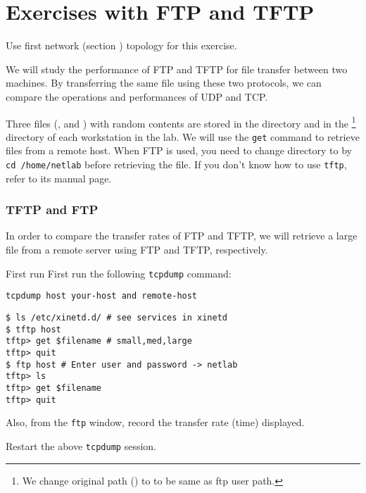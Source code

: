 \documentclass{../UTNetLab}
\begin{document}
\part{Exercises with FTP and TFTP}
    Use first network (section ) topology for this exercise.

    We will study the performance of FTP and TFTP for file transfer between two machines.
    By transferring the same file using these two protocols, we can compare the operations and performances of UDP and TCP. 

    Three files (,  and ) with random contents are stored in the  directory and in the \footnote{We change original path () to  to be same as ftp user path.} directory of each workstation in the lab.
    We will use the \lstinline{get} command to retrieve files from a remote host.
    When FTP is used, you need to change directory to  by \lstinline{cd /home/netlab} before retrieving the file.
    If you don’t know how to use \lstinline{tftp}, refer to its manual page.


\section{TFTP and FTP}
    In order to compare the transfer rates of FTP and TFTP, we will retrieve a large file from a remote server using FTP and TFTP, respectively.

    First run First run the following \lstinline{tcpdump} command:
    \begin{lstlisting}
tcpdump host your-host and remote-host
    \end{lstlisting}
    \begin{lstlisting}[emph={host}]
$ ls /etc/xinetd.d/ # see services in xinetd
$ tftp host
tftp> get $filename # small,med,large
tftp> quit
$ ftp host # Enter user and password -> netlab
tftp> ls
tftp> get $filename
tftp> quit
    \end{lstlisting}

    Also, from the \lstinline{ftp} window, record the transfer rate (time) displayed. 

    Restart the above \lstinline{tcpdump} session.
\end{document}
